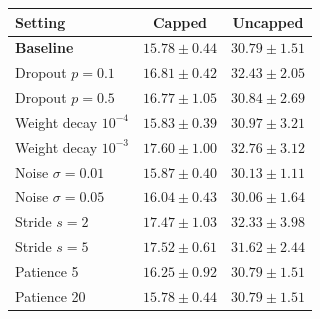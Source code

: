 \begin{tabular}{@{}lcc@{}}
\hline
Setting & Capped & Uncapped \\
\hline
\textbf{Baseline} & $15.78 \pm 0.44$ & $30.79 \pm 1.51$ \\
Dropout $p=0.1$ & $16.81 \pm 0.42$ & $32.43 \pm 2.05$ \\
Dropout $p=0.5$ & $16.77 \pm 1.05$ & $30.84 \pm 2.69$ \\
Weight decay $10^{-4}$ & $15.83 \pm 0.39$ & $30.97 \pm 3.21$ \\
Weight decay $10^{-3}$ & $17.60 \pm 1.00$ & $32.76 \pm 3.12$ \\
Noise $\sigma=0.01$ & $15.87 \pm 0.40$ & $30.13 \pm 1.11$ \\
Noise $\sigma=0.05$ & $16.04 \pm 0.43$ & $30.06 \pm 1.64$ \\
Stride $s=2$ & $17.47 \pm 1.03$ & $32.33 \pm 3.98$ \\
Stride $s=5$ & $17.52 \pm 0.61$ & $31.62 \pm 2.44$ \\
Patience 5 & $16.25 \pm 0.92$ & $30.79 \pm 1.51$ \\
Patience 20 & $15.78 \pm 0.44$ & $30.79 \pm 1.51$ \\
\hline
\end{tabular}
